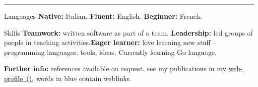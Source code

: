 \vspace{-3mm}
\rule{\textwidth}{0.5pt}\vspace{-1mm}

\begin{cvskills}

\cvskill
{Languages}
{\textbf{Native:} Italian. \textbf{Fluent:} English. \textbf{Beginner:} French.}

\cvskill
{Skills}
{\textbf{Teamwork:} written software as part of a team. \hspace{+3mm} 
\textbf{Leadership:} 
led groups of people in teaching activities.\newline \textbf{Eager learner:} 
love learning new stuff -- programming languages, tools, ideas. Currently 
learning Go language.}

\end{cvskills}

\flushleft
\footnotesize
\item {\color{awesome-darknight}\textbf{Further 
info:}} references available on request, see my publications in my 
{\href{https://www.ncl.ac.uk/engineering/staff/profile/alessandrode-gennaro.html}{{\color{myblue}web-profile}~(\profLogo\hspace{-0.8mm})}},
words in {\color{myblue}blue} contain weblinks.